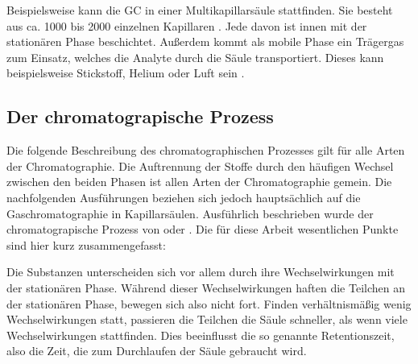 Beispielsweise kann die GC in einer Multikapillarsäule stattfinden. Sie besteht aus ca. 1000 bis 2000 einzelnen Kapillaren \citep{obinski1999, Baumbach2009}. Jede davon ist innen mit der stationären Phase beschichtet. Außerdem kommt als mobile Phase ein Trägergas zum Einsatz, welches die Analyte durch die Säule transportiert. Dieses kann beispielsweise Stickstoff, Helium \citep{obinski1999} oder Luft sein \citep{Baumbach2009}.

\subsection{Der chromatograpische Prozess}

Die folgende Beschreibung des chromatographischen Prozesses gilt für alle Arten der Chromatographie. Die Auftrennung der Stoffe durch den häufigen Wechsel zwischen den beiden Phasen ist allen Arten der Chromatographie gemein. Die nachfolgenden Ausführungen beziehen sich jedoch hauptsächlich auf die Gaschromatographie in Kapillarsäulen.
Ausführlich beschrieben wurde der chromatograpische Prozess von \cite{kolb2003} oder \cite{kaltenboeck2008}.
Die für diese Arbeit wesentlichen Punkte sind hier kurz zusammengefasst:

Die Substanzen unterscheiden sich vor allem durch ihre Wechselwirkungen mit der stationären Phase. Während dieser Wechselwirkungen haften die Teilchen an der stationären Phase, bewegen sich also nicht fort. Finden verhältnismäßig wenig Wechselwirkungen statt, passieren die Teilchen die Säule schneller, als wenn viele Wechselwirkungen stattfinden. Dies beeinflusst die so genannte Retentionszeit, also die Zeit, die zum Durchlaufen der Säule gebraucht wird.

